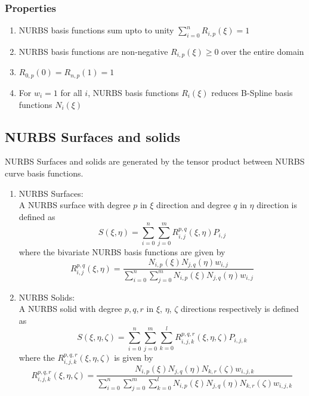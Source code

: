 \documentclass[11pt]{article}
\begin{document}
\subsubsection{Properties }
\begin{enumerate}
	\item NURBS basis functions sum upto to unity $\sum_{i=0}^{n} R_{i,p}(\xi) =1$
	\item NURBS basis functions are non-negative $ R_{i,p}(\xi) \geq 0$ over the entire
	domain
	\item $R_{0,p}(0)=R_{n,p}(1)=1$
	\item For $w_i=1$ for all $i$, NURBS basis functions $R_i(\xi)$ reduces B-Spline basis functions $N_i(\xi)$ 
\end{enumerate}
\subsection{NURBS Surfaces and solids }
NURBS Surfaces and solids are generated by the tensor product between NURBS curve basis functions.
\begin{enumerate}[leftmargin=*]
	\item NURBS Surfaces: \\
	A NURBS surface with degree $p$ in $\xi$ direction and degree $q$ in $\eta$
	direction is defined as \cite{agrawal2019iga}
	\begin{equation}
	S(\xi,\eta) = \sum_{i=0}^{n}\sum_{j=0}^{m} R_{i,j}^{p,q}(\xi,\eta)  P_{i,j}
	\end{equation}
	where the bivariate NURBS basis functions are given by
	\begin{equation}
	R_{i,j}^{p,q}(\xi,\eta)  =
	\frac{N_{i,p}(\xi)N_{j,q}(\eta)w_{i,j}}{\sum_{i=0}^{n}\sum_{j=0}^{m}N_{i,p}(\xi)N_{j,q}(\eta)w_{i,j}}
	\end{equation}
	\item NURBS Solids: \\
	A NURBS solid with degree $p,q,r$ in $\xi$, $\eta$, $\zeta$ directions
	respectively is defined as \cite{agrawal2019iga}
	\begin{equation}
	S(\xi,\eta,\zeta) = \sum_{i=0}^{n}\sum_{j=0}^{m}\sum_{k=0}^{l}
	R_{i,j,k}^{p,q,r}(\xi,\eta,\zeta)  P_{i,j,k}
	\end{equation}
	where the $R_{i,j,k}^{p,q,r}(\xi,\eta,\zeta)$ is given by
	\begin{equation}
	R_{i,j,k}^{p,q,r}(\xi,\eta,\zeta)  =
	\frac{N_{i,p}(\xi)N_{j,q}(\eta)N_{k,r}(\zeta)w_{i,j,k}}{\sum_{i=0}^{n}\sum_{j=0}^{m}
		\sum_{k=0}^{l} N_{i,p}(\xi)N_{j,q}(\eta)N_{k,r}(\zeta)w_{i,j,k}}
	\end{equation}
\end{enumerate}
\end{document}
